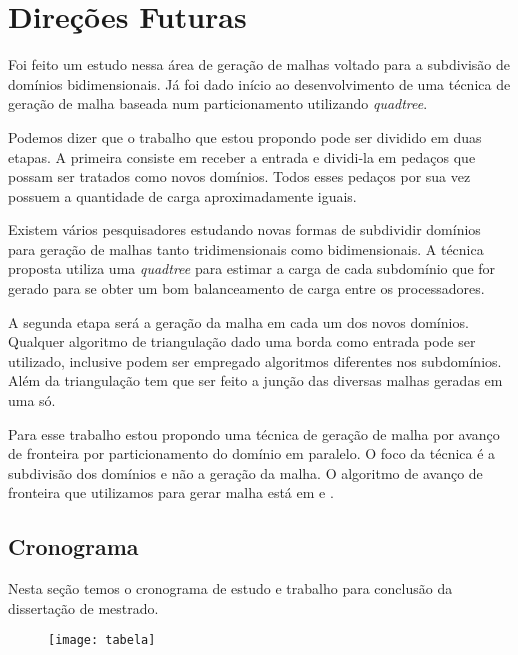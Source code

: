\pagestyle{empty}
\cleardoublepage
\pagestyle{fancy}
\chapter{Direções Futuras}\label{cap4}

Foi feito um estudo nessa área de geração de malhas voltado para a subdivisão de domínios bidimensionais. Já foi dado início ao desenvolvimento de uma técnica de geração de malha baseada num particionamento utilizando \textit{quadtree}.

Podemos dizer que o trabalho que estou propondo pode ser dividido em duas etapas. A primeira consiste em receber a entrada e dividi-la em pedaços que possam ser tratados como novos domínios. Todos esses pedaços por sua vez possuem a quantidade de carga aproximadamente iguais.

Existem vários pesquisadores estudando novas formas de subdividir domínios para geração de malhas tanto tridimensionais como bidimensionais. A técnica proposta utiliza uma \textit{quadtree} para estimar a carga de cada subdomínio que for gerado para se obter um bom balanceamento de carga entre os processadores.

A segunda etapa será a geração da malha em cada um dos novos domínios. Qualquer algoritmo de triangulação dado uma borda como entrada pode ser utilizado, inclusive podem ser empregado algoritmos diferentes nos subdomínios. Além da triangulação tem que ser feito a junção das diversas malhas geradas em uma só.

Para esse trabalho estou propondo uma técnica de geração de malha por avanço de fronteira por particionamento do domínio em paralelo. O foco da técnica é a subdivisão dos domínios e não a geração da malha. O algoritmo de avanço de fronteira que utilizamos para gerar malha está em \cite{bib:Miranda99} e \cite{bib:Cavalcante-Neto01}.

\section{Cronograma}
Nesta seção temos o cronograma de estudo e trabalho para conclusão da dissertação de mestrado.

 \begin{figure}[htbp]
     \begin{center}
     \texttt{[image: tabela]}
     \label{fig:tabela}
     \end{center}
 \end{figure}